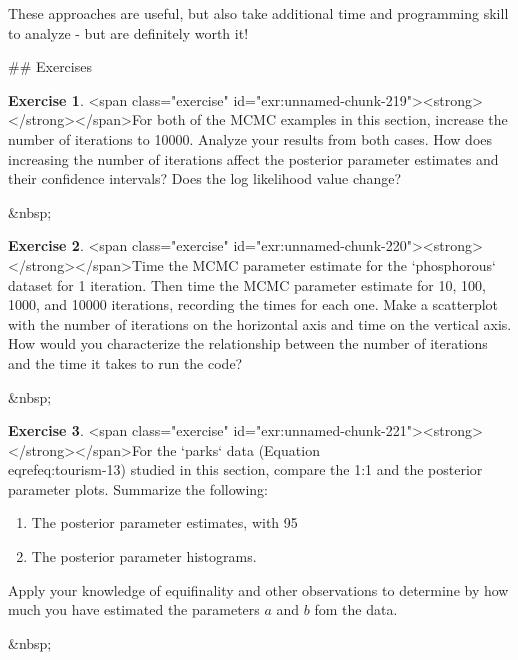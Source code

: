 \documentclass[
]{book}
\theoremstyle{definition}
\theoremstyle{definition}
\theoremstyle{definition}
\newtheorem{exercise}{Exercise}[chapter]
\theoremstyle{remark}
\begin{document}
These approaches are useful, but also take additional time and programming skill to analyze - but are definitely worth it!


\newpage

## Exercises
\begin{exercise}
<span class="exercise" id="exr:unnamed-chunk-219"><strong>\label{exr:unnamed-chunk-219} </strong></span>For both of the MCMC examples in this section, increase the number of iterations to 10000.  Analyze your results from both cases.  How does increasing the number of iterations affect the posterior parameter estimates and their confidence intervals?  Does the log likelihood value change?
\end{exercise}

&nbsp;

\begin{exercise}
<span class="exercise" id="exr:unnamed-chunk-220"><strong>\label{exr:unnamed-chunk-220} </strong></span>Time the MCMC parameter estimate for the `phosphorous` dataset for 1 iteration. Then time the MCMC parameter estimate for 10, 100, 1000, and 10000 iterations, recording the times for each one. Make a scatterplot with the number of iterations on the horizontal axis and time on the vertical axis. How would you characterize the relationship between the number of iterations and the time it takes to run the code?
\end{exercise}

&nbsp;

\begin{exercise}
<span class="exercise" id="exr:unnamed-chunk-221"><strong>\label{exr:unnamed-chunk-221} </strong></span>For the `parks` data (Equation \\eqref{eq:tourism-13}) studied in this section, compare the 1:1 and the posterior parameter plots.  Summarize the following:
  
\begin{enumerate}[label=\alph*.]
\item The posterior parameter estimates, with 95%
\item The posterior parameter histograms.
\end{enumerate}

Apply your knowledge of equifinality and other observations to determine by how much you have estimated the parameters $a$ and $b$ fom the data.
\end{exercise}

&nbsp;
\end{document}
